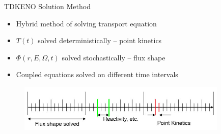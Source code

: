 
\begin{frame}{TDKENO Solution Method}

\begin{itemize}[<+-| alert@+>]
    \item Hybrid method of solving transport equation 
    \item $T(t)$ solved deterministically -- point kinetics
    \item $ \Phi(r,E,\Omega,t)$ solved stochastically -- flux shape
    \item Coupled equations solved on different time intervals
\end{itemize}
\begin{figure}
    \centering
    \includegraphics[width=10cm]{figures/time_scale_COLOR.jpg}
    \label{fig:time_scale}
\end{figure}



\end{frame}